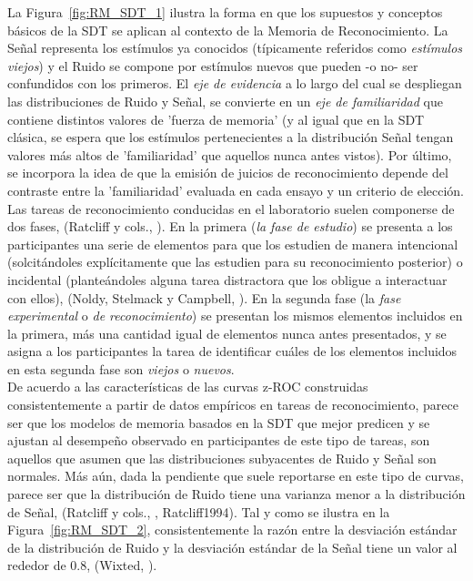 La Figura~\ref{fig:RM_SDT_1} ilustra la forma en que los supuestos y conceptos básicos de la SDT se aplican al contexto de la Memoria de Reconocimiento. La Señal representa los estímulos ya conocidos (típicamente referidos como \textit{estímulos viejos}) y el Ruido se compone por estímulos nuevos que pueden -o no- ser confundidos con los primeros. El \textit{eje de evidencia} a lo largo del cual se despliegan las distribuciones de Ruido y Señal, se convierte en un \textit{eje de familiaridad} que contiene distintos valores de 'fuerza de memoria' (y al igual que en la SDT clásica, se espera que los estímulos pertenecientes a la distribución Señal tengan valores más altos de 'familiaridad' que aquellos nunca antes vistos). Por último, se incorpora la idea de que la emisión de juicios de reconocimiento depende del contraste entre la 'familiaridad' evaluada en cada ensayo y un criterio de elección.\\

Las tareas de reconocimiento conducidas en el laboratorio suelen componerse de dos fases, (Ratcliff y cols., \citeyear{Ratcliff1992}). En la primera (\textit{la fase de estudio}) se presenta a los participantes una serie de elementos para que los estudien de manera intencional (solcitándoles explícitamente que las estudien para su reconocimiento posterior) o incidental (planteándoles alguna tarea distractora que los obligue a interactuar con ellos), (Noldy, Stelmack y Campbell, \citeyear{Noldy1990}). En la segunda fase (la \textit{fase experimental} o \textit{de reconocimiento}) se presentan los mismos elementos incluidos en la primera, más una cantidad igual de elementos nunca antes presentados, y se asigna a los participantes la tarea de identificar cuáles de los elementos incluidos en esta segunda fase son \textit{viejos} o \textit{nuevos}.\\

De acuerdo a las características de las curvas z-ROC construidas consistentemente a partir de datos empíricos en tareas de reconocimiento, parece ser que los modelos de memoria basados en la SDT que mejor predicen y se ajustan al desempeño observado en participantes de este tipo de tareas, son aquellos que asumen que las distribuciones subyacentes de Ruido y Señal son normales. Más aún, dada la pendiente que suele reportarse en este tipo de curvas, parece ser que la distribución de Ruido tiene una varianza menor a la distribución de Señal, (Ratcliff y cols., \citeyear{ Ratcliff1992}, {Ratcliff1994}). Tal y como se ilustra en la Figura~\ref{fig:RM_SDT_2}, consistentemente la razón entre la desviación estándar de la distribución de Ruido y la desviación estándar de la Señal tiene un valor al rededor de 0.8, (Wixted, \citeyear{Wixted2007}).\\

